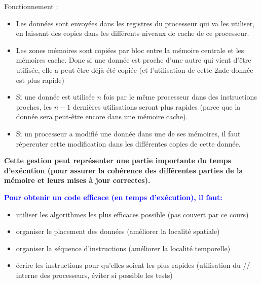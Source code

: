 \documentclass{beamer}
\begin{document}
\begin{frame}[fragile]
Fonctionnement :

\begin{itemize}
	\item Les donn\'ees sont envoy\'ees dans les registres du processeur qui va les utiliser, en laissant des copies dans les diff\'erents niveaux de cache de ce processeur. 
	\vfill
	
	\item Les zones m\'emoires sont copi\'ees par bloc entre la m\'emoire centrale et les m\'emoires cache. Donc si une donn\'ee est proche d'une autre qui vient d'\^etre utilis\'ee, elle a peut-\^etre d\'ej\`a \'et\'e copi\'ee (et l'utilisation de cette 2nde donn\'ee est plus rapide)	
\end{itemize}
	\vfill
\end{frame}

\begin{frame}[fragile]
	
\begin{itemize}
	\item Si une donn\'ee est utilis\'ee $n$ fois par le m\^eme processeur dans des instructions proches, les $n-1$ derni\`eres utilisations seront plus rapides (parce que la donn\'ee sera peut-\^etre encore dans une m\'emoire cache).
\vfill

	\item Si un processeur a modifi\'e une donn\'ee dans une de ses m\'emoires, il faut r\'epercuter cette modification dans les diff\'erentes copies de cette donn\'ee.
	\vfill
\end{itemize}
	\vfill

{\bf Cette gestion peut repr\'esenter une partie im\-por\-tante du temps d'ex\'ecution (pour assurer la coh\'erence des diff\'erentes parties de la m\'emoire et leurs mises \`a jour correctes).}
	\vfill


\end{frame}

\begin{frame}[fragile]

\bf
\textcolor{blue}{Pour obtenir un code efficace (en temps d'ex\'ecution), il faut:}

\begin{itemize}
	\item utiliser les algorithmes les plus efficaces possible (pas couvert par ce cours)
	
	\item organiser le placement des donn\'ees (am\'eliorer la localit\'e spatiale)
	
	\item organiser la s\'equence d'instructions (am\'eliorer la localit\'e temporelle)

	\item \'ecrire les instructions pour qu'elles soient les plus rapides (utilisation du // interne des processeurs, \'eviter si possible les tests)
\end{itemize}
\end{frame}
\end{document}
